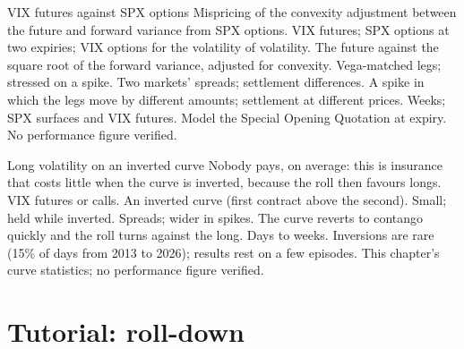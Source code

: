 \begin{strategyfile}{VIX futures against SPX options}\label{strat:s2:the-volatility-index-complex:options}
 Mispricing of the convexity adjustment between the future and forward variance from SPX options.
 VIX futures; SPX options at two expiries; VIX options for the volatility of volatility.
 The future against the square root of the forward variance, adjusted for convexity.
 Vega-matched legs; stressed on a spike.
 Two markets' spreads; settlement differences.
 A spike in which the legs move by different amounts; settlement at different prices.
 Weeks; SPX surfaces and VIX futures.
 Model the Special Opening Quotation at expiry.
 No performance figure verified.
\end{strategyfile}

\begin{strategyfile}{Long volatility on an inverted curve}\label{strat:s2:the-volatility-index-complex:inverted}
 Nobody pays, on average: this is insurance that costs little when the curve is inverted, because the roll then favours
longs.
 VIX futures or calls.
 An inverted curve (first contract above the second).
 Small; held while inverted.
 Spreads; wider in spikes.
 The curve reverts to contango quickly and the roll turns against the long.
 Days to weeks.
 Inversions are rare (15\% of days from 2013 to 2026); results rest on a few episodes.
 This chapter's curve statistics; no performance figure verified.
\end{strategyfile}

\section{Tutorial: roll-down}\label{tut:s2:the-volatility-index-complex:tut}

